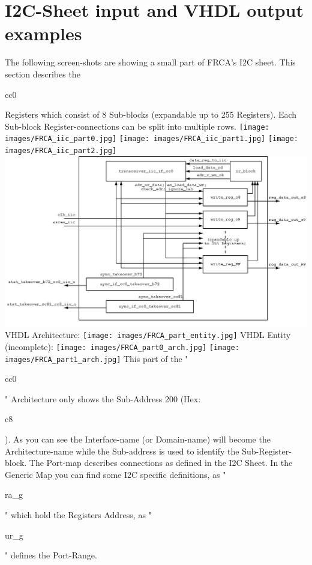 \documentclass[a4paper,12pt]{report}
\begin{document}
\section{I2C-Sheet input and VHDL output examples}
The following screen-shots are showing a small part of  FRCA's I2C sheet. This section describes the \begin{tt}cc0\end{tt} Registers which consist of 8 Sub-blocks (expandable up to 255 Registers). Each Sub-block Register-connections can be split into multiple rows.\newline
\newline
\texttt{[image: images/FRCA\_iic\_part0.jpg]}\newline
\newline
\texttt{[image: images/FRCA\_iic\_part1.jpg]}\newline
\newline
\texttt{[image: images/FRCA\_iic\_part2.jpg]}\newline
\newline
\includegraphics[scale=0.4]{images/serial_iic_reg.jpg}\newline
\newpage
VHDL Architecture:\newline
\texttt{[image: images/FRCA\_part\_entity.jpg]}\newline
\newpage
VHDL Entity (incomplete):\newline
\texttt{[image: images/FRCA\_part0\_arch.jpg]}\newline
\newline
\texttt{[image: images/FRCA\_part1\_arch.jpg]}\newline
This part of the "\begin{tt}cc0\end{tt}" Architecture only shows the Sub-Address 200 (Hex: \begin{tt}c8\end{tt}). As you can see the Interface-name (or Domain-name) will become the Architecture-name while the Sub-address is used to identify the Sub-Register-block. The Port-map describes connections as defined in the I2C Sheet. In the Generic Map you can find some I2C specific definitions, as "\begin{tt}ra\_g\end{tt}" which hold the Registers Address, as "\begin{tt}ur\_g\end{tt}" defines the Port-Range.
\end{document}
